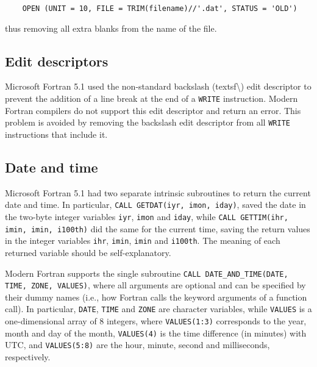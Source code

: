 \begin{lstlisting}
	OPEN (UNIT = 10, FILE = TRIM(filename)//'.dat', STATUS = 'OLD')
\end{lstlisting}

thus removing all extra blanks from the name of the file.



\subsection{Edit descriptors}

Microsoft Fortran 5.1 used the non-standard backslash (textsf{\textbackslash{}}) edit descriptor to prevent the addition of a line break at the end of a \texttt{WRITE} instruction.
Modern Fortran compilers do not support this edit descriptor and return an error. This problem is avoided by removing the backslash edit descriptor from all \texttt{WRITE} instructions that include it.



\subsection{Date and time}

Microsoft Fortran 5.1 had two separate intrinsic subroutines to return the current date and time.
In particular, \lstinline[columns=fixed]{CALL GETDAT(iyr, imon, iday)}, saved the date in the two-byte integer variables \texttt{iyr}, \texttt{imon} and \texttt{iday}, while \lstinline[columns=fixed]{CALL GETTIM(ihr, imin, imin, i100th)} did the same for the current time, saving the return values in the integer variables \texttt{ihr}, \texttt{imin}, \texttt{imin} and \texttt{i100th}. The meaning of each returned variable should be self-explanatory.

Modern Fortran supports the single subroutine \lstinline[columns=fixed]{CALL DATE_AND_TIME(DATE, TIME, ZONE, VALUES)}, where all arguments are optional and can be specified by their dummy names (i.e., how Fortran calls the keyword arguments of a function call). 
In particular, \texttt{DATE}, \texttt{TIME} and \texttt{ZONE} are character variables, while \texttt{VALUES} is a one-dimensional array of 8 integers, where \texttt{VALUES(1:3)} corresponds to the year, month and day of the month, \texttt{VALUES(4)} is the time difference (in minutes) with UTC, and \texttt{VALUES(5:8)} are the hour, minute, second and milliseconds, respectively.

